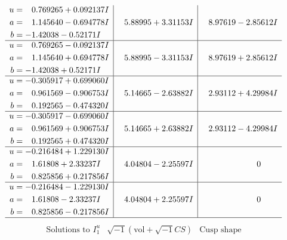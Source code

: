 \documentclass[1p]{elsarticle_modified}
\theoremstyle{definition}
\newcommand{\I}{\sqrt{-1}}
\begin{document}
$$\begin{array}{c|c|c}
\begin{aligned}
u &= \phantom{-}0.769265 + 0.092137 I \\
a &= \phantom{-}1.145640 - 0.694778 I \\
b &= -1.42038 - 0.52171 I\end{aligned}
 & \phantom{-}5.88995 + 3.31153 I & \phantom{-}8.97619 - 2.85612 I \\ \hline\begin{aligned}
u &= \phantom{-}0.769265 - 0.092137 I \\
a &= \phantom{-}1.145640 + 0.694778 I \\
b &= -1.42038 + 0.52171 I\end{aligned}
 & \phantom{-}5.88995 - 3.31153 I & \phantom{-}8.97619 + 2.85612 I \\ \hline\begin{aligned}
u &= -0.305917 + 0.699060 I \\
a &= \phantom{-}0.961569 - 0.906753 I \\
b &= \phantom{-}0.192565 - 0.474320 I\end{aligned}
 & \phantom{-}5.14665 - 2.63882 I & \phantom{-}2.93112 + 4.29984 I \\ \hline\begin{aligned}
u &= -0.305917 - 0.699060 I \\
a &= \phantom{-}0.961569 + 0.906753 I \\
b &= \phantom{-}0.192565 + 0.474320 I\end{aligned}
 & \phantom{-}5.14665 + 2.63882 I & \phantom{-}2.93112 - 4.29984 I \\ \hline\begin{aligned}
u &= -0.216484 + 1.229130 I \\
a &= \phantom{-}1.61808 + 2.33237 I \\
b &= \phantom{-}0.825856 + 0.217856 I\end{aligned}
 & \phantom{-}4.04804 - 2.25597 I & \phantom{-0.000000 } 0 \\ \hline\begin{aligned}
u &= -0.216484 - 1.229130 I \\
a &= \phantom{-}1.61808 - 2.33237 I \\
b &= \phantom{-}0.825856 - 0.217856 I\end{aligned}
 & \phantom{-}4.04804 + 2.25597 I & \phantom{-0.000000 } 0\\
 \hline 
 \end{array}$$\newpage$$\begin{array}{c|c|c}  
\text{Solutions to }I^u_{1}& \I (\text{vol} + \sqrt{-1}CS) & \text{Cusp shape}\\

\end{array}$$
\end{document}
